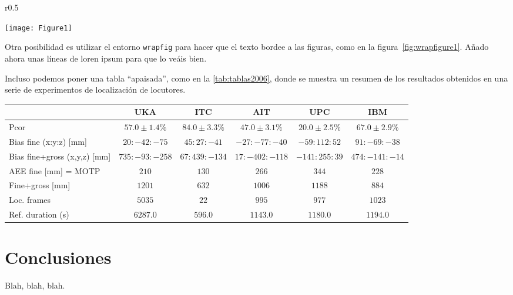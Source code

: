  

\begin{wrapfigure}{r}{0.5\textwidth} 
\vspace{-20pt}
  \begin{center}
    \texttt{[image: Figure1]}
    \caption{Ejemplo de figura con wrapfigure.}
    \label{fig:wrapfigure1}
  \end{center}
  \vspace{-20pt}
  \vspace{1pt}
\end{wrapfigure} 

Otra posibilidad es utilizar el entorno \texttt{wrapfig} para hacer que el texto bordee a las figuras, como en la figura~\ref{fig:wrapfigure1}. Añado ahora unas líneas de loren ipsum para que lo veáis bien. \lipsum[1-1]


Incluso podemos poner una tabla ``apaisada'', como en la \ref{tab:tablas2006}, donde se muestra un resumen de los resultados obtenidos en una serie de experimentos de localización de locutores.

\clearpage
\begin{sidewaystable}[hbtp]
  \begin{center}

    \begin{tabular}{||l|c|c|c|c|c||}
      \hline \hline
      & UKA & ITC & AIT & UPC & IBM\\
      \hline
      \hline
      Pcor & $57.0\pm1.4\%$ & $84.0\pm3.3\%$ & $47.0\pm3.1\%$ & $20.0\pm2.5\%$ & $67.0\pm2.9\%$ \\
      \hline
      Bias fine (x:y:z) [mm] & $20:-42:-75$ & $45:27:-41$ & $-27:-77:-40$ & $-59:112:52$ & $91:-69:-38$ \\
      \hline
      Bias fine+gross (x,y,z) [mm] & $735:-93:-258$ & $67:439:-134$ & $17:-402:-118$ & $-141:255:39$ & $474:-141:-14$ \\
      \hline
      AEE fine [mm] = MOTP & $210$ & $130$ & $266$ & $344$ & $228$ \\
      \hline
      Fine+gross [mm] & $1201$ & $632$ & $1006$ & $1188$ & $884$ \\
      \hline
      Loc. frames & $5035$ & $22$ & $995$ & $977$ & $1023$ \\
      \hline
      Ref. duration (s) & $6287.0$ & $596.0$ & $1143.0$ & $1180.0$ & $1194.0$ \\
      \hline \hline
    \end{tabular}
    \caption{Resultados TEST CLEAR 2006.}
    \label{tab:tablas2006}
  \end{center}
\end{sidewaystable}


\section{Conclusiones}
\label{sec:conclusiones-resultados}

Blah, blah, blah.



